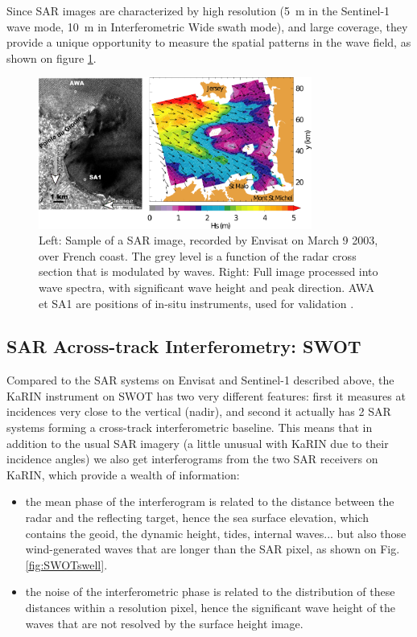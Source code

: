 Since SAR images are characterized by high resolution (5~m in the Sentinel-1 wave mode, 10~m in Interferometric Wide swath mode), and large coverage, they provide a unique opportunity 
to measure the spatial patterns in the wave field, as shown on figure \ref{SAR_exemple}.

\begin{figure}[!h]
\centerline{\includegraphics[width=0.8\textwidth]{FIGS_CH_SAT/Image_SAR_Cancale2.png}}
\caption{Left: Sample of a SAR image, recorded by Envisat  on March 9 2003, over French coast. The grey level is a function of the radar cross section that is modulated by waves. 
Right: Full image processed into wave spectra, with significant wave height and peak direction. AWA et SA1 are positions of in-situ instruments, 
used for validation \citep{Collard&al.2005}.}
\label{SAR_exemple}
\end{figure}



\subsection{SAR Across-track Interferometry: SWOT}
Compared to the SAR systems on Envisat and Sentinel-1 described above, the KaRIN instrument on SWOT has two very different features: first it measures at incidences very close to the vertical (nadir), and second it actually has 2 SAR systems forming a cross-track interferometric baseline. This means that in addition to the usual SAR imagery (a little unusual with KaRIN due to their incidence angles) we also get interferograms from the two SAR receivers on KaRIN, which provide a wealth of information: 
\begin{itemize}
\item the mean phase of the interferogram is related to the distance between the radar and the reflecting target, hence the sea surface elevation, which contains the geoid, the dynamic height, tides, internal waves... but also those wind-generated waves that are longer than the SAR pixel, as shown on Fig. \ref{fig:SWOTswell}. 
\item the noise of the interferometric phase is related to the distribution of these distances within a resolution pixel, hence the significant wave height of the waves that are not resolved by the surface height image. 
\end{itemize}

